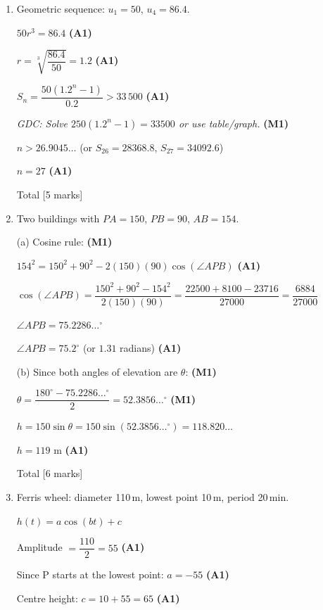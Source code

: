 \documentclass[12pt, twoside]{article}
\begin{document}
\begin{enumerate}[itemsep=0.4cm]
\bigskip

\item Geometric sequence: $u_1 = 50$, $u_4 = 86.4$.

$50r^3 = 86.4$ \hfill \textbf{(A1)}

$r = \sqrt[3]{\dfrac{86.4}{50}} = 1.2$ \hfill \textbf{(A1)}

$S_n = \dfrac{50(1.2^n - 1)}{0.2} > 33\,500$ \hfill \textbf{(A1)}

\emph{GDC: Solve $250(1.2^n - 1) = 33500$ or use table/graph.} \hfill \textbf{(M1)}

$n > 26.9045\ldots$ \quad (or $S_{26} = 28368.8$, $S_{27} = 34092.6$)

$n = 27$ \hfill \textbf{(A1)}

\hfill Total [5 marks]

\bigskip

\item Two buildings with $PA = 150$, $PB = 90$, $AB = 154$.

(a) Cosine rule: \hfill \textbf{(M1)}

$154^2 = 150^2 + 90^2 - 2(150)(90)\cos(\angle APB)$ \hfill \textbf{(A1)}

$\cos(\angle APB) = \dfrac{150^2 + 90^2 - 154^2}{2(150)(90)}
= \dfrac{22500 + 8100 - 23716}{27000} = \dfrac{6884}{27000}$

$\angle APB = 75.2286\ldots^\circ$

$\angle APB = 75.2^\circ$ (or $1.31$ radians) \hfill \textbf{(A1)}

\medskip
(b) Since both angles of elevation are $\theta$: \hfill \textbf{(M1)}

$\theta = \dfrac{180^\circ - 75.2286\ldots^\circ}{2} = 52.3856\ldots^\circ$ \hfill \textbf{(M1)}

$h = 150\sin\theta = 150\sin(52.3856\ldots^\circ) = 118.820\ldots$

$h = 119$ m \hfill \textbf{(A1)}

\hfill Total [6 marks]

\bigskip

\item Ferris wheel: diameter 110\,m, lowest point 10\,m, period 20\,min.

$h(t) = a\cos(bt) + c$

Amplitude $= \dfrac{110}{2} = 55$ \hfill \textbf{(A1)}

Since P starts at the lowest point: $a = -55$ \hfill \textbf{(A1)}

Centre height: $c = 10 + 55 = 65$ \hfill \textbf{(A1)}


\end{enumerate}
\end{document}
